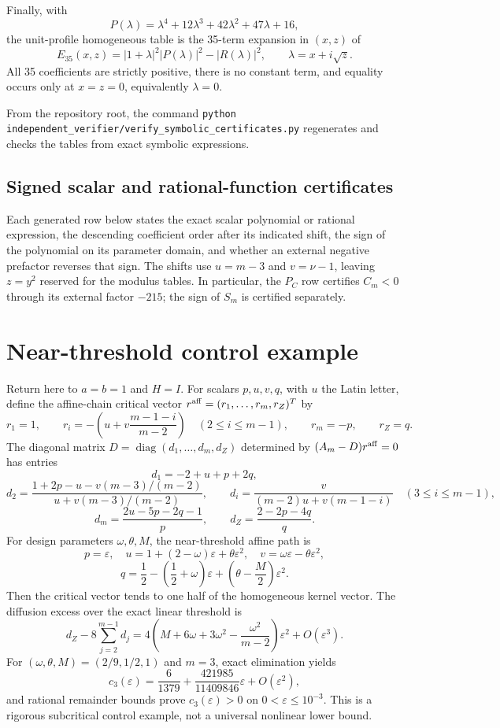\documentclass[10pt]{article}
\newcommand{\diag}{\operatorname{diag}}
\newcommand{\1}{\mathbf1}
\begin{document}
Finally, with
\[
 P(\lambda)=\lambda^4+12\lambda^3+42\lambda^2+47\lambda+16,
\]
the unit-profile homogeneous table is the 35-term expansion in $(x,z)$ of
\[
 E_{35}(x,z)=|1+\lambda|^2|P(\lambda)|^2-|R(\lambda)|^2,
 \qquad \lambda=x+i\sqrt z.
\]
All 35 coefficients are strictly positive, there is no constant term, and
equality occurs only at $x=z=0$, equivalently $\lambda=0$.

From the repository root, the command
\texttt{python independent\_verifier/verify\_symbolic\_certificates.py}
regenerates and checks the tables from exact symbolic expressions.



\subsection{Signed scalar and rational-function certificates}

Each generated row below states the exact scalar polynomial or rational
expression, the descending coefficient order after its indicated shift, the
sign of the polynomial on its parameter domain, and whether an external
negative prefactor reverses that sign.  The shifts use $u=m-3$ and
$v=\nu-1$, leaving $z=y^2$ reserved for the modulus tables.  In particular,
the $P_C$ row certifies $C_m<0$ through its external factor $-215$; the sign
of $S_m$ is certified separately.



\section{Near-threshold control example}

Return here to $a=b=1$ and $H=I$.  For scalars $p,u,v,q$, with $u$ the
Latin letter, define the affine-chain critical vector
$r^{\rm aff}=(r_1,\ldots,r_m,r_Z)^T$ by
\[
 r_1=1,\qquad
 r_i=-\left(u+v\frac{m-1-i}{m-2}\right)
 \quad(2\le i\le m-1),
 \qquad r_m=-p,\qquad r_Z=q.
\]
The diagonal matrix $D=\diag(d_1,\ldots,d_m,d_Z)$ determined by
$(A_m-D)r^{\rm aff}=0$ has entries
\[
 d_1=-2+u+p+2q,
\]
\[
 d_2=
 \frac{1+2p-u-v(m-3)/(m-2)}
 {u+v(m-3)/(m-2)},
 \qquad
 d_i=\frac{v}{(m-2)u+v(m-1-i)}
 \quad(3\le i\le m-1),
\]
\[
 d_m=\frac{2u-5p-2q-1}{p},
 \qquad
 d_Z=\frac{2-2p-4q}{q}.
\]
For design parameters $\omega,\theta,M$, the near-threshold affine path is
\[
p=\varepsilon,\quad
u=1+(2-\omega)\varepsilon+\theta\varepsilon^2,\quad
v=\omega\varepsilon-\theta\varepsilon^2,
\]
\[
q=\frac12-\left(\frac12+\omega\right)\varepsilon
 +\left(\theta-\frac M2\right)\varepsilon^2.
\]
Then the critical vector tends to one half of the homogeneous kernel vector.  The
diffusion excess over the exact linear threshold is
\[
 d_Z-8\sum_{j=2}^{m-1}d_j
 =4\left(M+6\omega+3\omega^2-\frac{\omega^2}{m-2}\right)\varepsilon^2
 +O(\varepsilon^3).
\]
For $(\omega,\theta,M)=(2/9,1/2,1)$ and $m=3$, exact elimination yields
\[
 c_3(\varepsilon)=\frac6{1379}
 +\frac{421985}{11409846}\varepsilon+O(\varepsilon^2),
\]
and rational remainder bounds prove $c_3(\varepsilon)>0$ on
$0<\varepsilon\le10^{-3}$.  This is a rigorous subcritical control example,
not a universal nonlinear lower bound.
\end{document}
